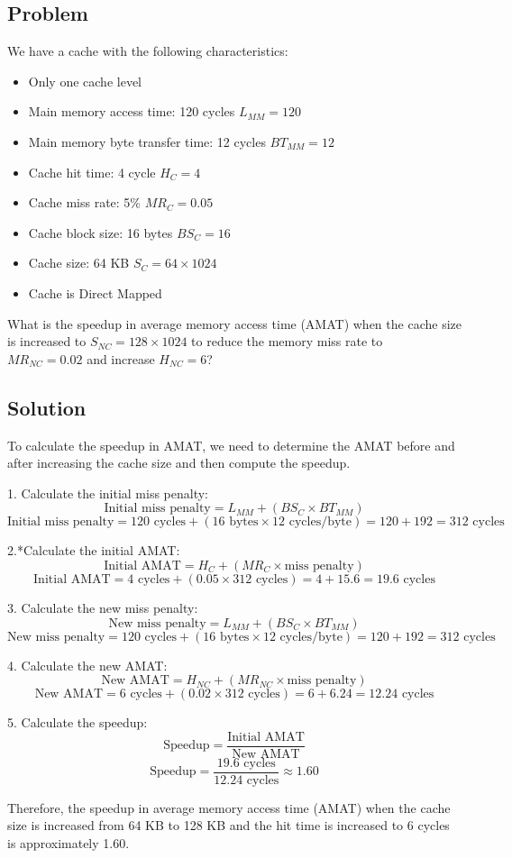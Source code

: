 \subsection*{Problem}

We have a cache with the following characteristics:
\begin{itemize}
    \item Only one cache level
    \item Main memory access time: 120 cycles $L_{MM}=120$
    \item Main memory byte transfer time: 12 cycles $BT_{MM}=12$
    \item Cache hit time: 4 cycle $H_{C}=4$
    \item Cache miss rate: 5\% $MR_{C}=0.05$
    \item Cache block size: 16 bytes $BS_{C}=16$
    \item Cache size: 64 KB $S_{C}=64 \times 1024$
    \item Cache is Direct Mapped
\end{itemize}
What is the speedup in average memory access time (AMAT) when the cache size is increased to $S_{NC}=128 \times 1024$ to reduce the memory miss rate to $MR_{NC}=0.02$ and increase $H_{NC}=6$?

\subsection*{Solution}

To calculate the speedup in AMAT, we need to determine the AMAT before and after increasing the cache size and then compute the speedup.

1. Calculate the initial miss penalty:
\[
\text{Initial miss penalty} = L_{MM} + (BS_{C} \times BT_{MM})
\]
\[
\text{Initial miss penalty} = 120 \text{ cycles} + (16 \text{ bytes} \times 12 \text{ cycles/byte}) = 120 + 192 = 312 \text{ cycles}
\]

2.*Calculate the initial AMAT:
\[
\text{Initial AMAT} = H_{C} + (MR_{C} \times \text{miss penalty})
\]
\[
\text{Initial AMAT} = 4 \text{ cycles} + (0.05 \times 312 \text{ cycles}) = 4 + 15.6 = 19.6 \text{ cycles}
\]

3. Calculate the new miss penalty:
\[
\text{New miss penalty} = L_{MM} + (BS_{C} \times BT_{MM})
\]
\[
\text{New miss penalty} = 120 \text{ cycles} + (16 \text{ bytes} \times 12 \text{ cycles/byte}) = 120 + 192 = 312 \text{ cycles}
\]

4. Calculate the new AMAT:
\[
\text{New AMAT} = H_{NC} + (MR_{NC} \times \text{miss penalty})
\]
\[
\text{New AMAT} = 6 \text{ cycles} + (0.02 \times 312 \text{ cycles}) = 6 + 6.24 = 12.24 \text{ cycles}
\]

5. Calculate the speedup:
\[
\text{Speedup} = \frac{\text{Initial AMAT}}{\text{New AMAT}}
\]
\[
\text{Speedup} = \frac{19.6 \text{ cycles}}{12.24 \text{ cycles}} \approx 1.60
\]

Therefore, the speedup in average memory access time (AMAT) when the cache size is increased from 64 KB to 128 KB and the hit time is increased to 6 cycles is approximately 1.60.
